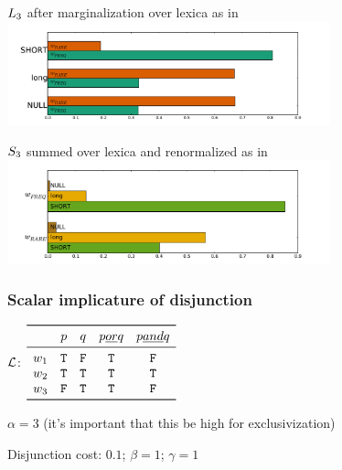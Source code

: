 \documentclass{article}
\begin{document}
\begin{examples}
\item $\ListenerK[3]$ after marginalization over lexica as in  \\
  \includegraphics[width=0.7\textwidth]{fig/manner-expertise-listener-marginalized}

\item $\SpeakerK[3]$ summed over lexica and renormalized as in  \\
  \includegraphics[width=0.7\textwidth]{fig/manner-expertise-speaker-lexsum}
\end{examples}

\newpage

\subsubsection{Scalar implicature of disjunction}\label{sec:scalar-disj}

\begin{examples}
\item 
  \begin{examples}
  \item 
    $\Lex$:
    $\begin{array}[c]{r *{4}{c}}
      \toprule
                    & p      & q      & p \word{ or } q & p \word{ and } q \\
      \midrule
      w_{1}          & \True    & \False & \True     & \False \\
      w_{2}          & \True    & \True  & \True     & \True  \\
      w_{3}           & \False  & \True  & \True     & \False \\
      \bottomrule
    \end{array}$
  \item $\alpha = 3$ (it's important that this be high for exclusivization)
  \item Disjunction cost: $0.1$; $\beta = 1$; $\gamma = 1$  
  \end{examples}
\end{examples}
\end{document}
